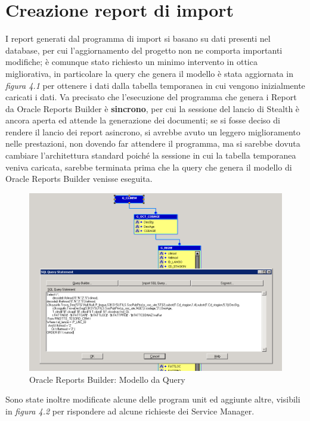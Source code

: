 \section{Creazione report di import}
I report generati dal programma di import si basano su dati presenti nel database, per cui l'aggiornamento del progetto non ne comporta importanti modifiche; è comunque stato richiesto un minimo intervento in ottica migliorativa, in particolare la query che genera il modello è stata aggiornata in \textit{figura 4.1} per ottenere i dati dalla tabella temporanea in cui vengono inizialmente caricati i dati. Va precisato che l'esecuzione del programma che genera i Report da Oracle Reports Builder è \textbf{sincrono}, per cui la sessione del lancio di Stealth è ancora aperta ed attende la generazione dei documenti; se si fosse deciso di rendere il lancio dei report asincrono, si avrebbe avuto un leggero miglioramento nelle prestazioni, non dovendo far attendere il programma, ma si sarebbe dovuta cambiare l'architettura standard poiché la sessione in cui la tabella temporanea veniva caricata, sarebbe terminata prima che la query che genera il modello di Oracle Reports Builder venisse eseguita.\\
\begin{figure}[!h]
\thispagestyle{empty}
\centering
\includegraphics[scale=0.60]{img/QueryRep.png}
\caption{Oracle Reports Builder: Modello da Query}
\end{figure}
\newpage
Sono state inoltre modificate alcune delle program unit ed aggiunte altre, visibili in \textit{figura 4.2} per rispondere ad alcune richieste dei Service Manager.\\

